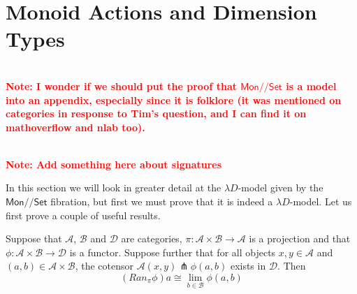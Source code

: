 \documentclass[a4paper,UKenglish]{lipics}
\newcommand\note[1]{{ \bf \textcolor{red} {\vspace{2mm}\; \\ Note: #1\\}}}
\newcommand{\ra}{\rightarrow}
\newcommand{\msf}[1]{\mathsf{#1}} %
\newcommand{\Mon}{\msf{Mon}}
\newcommand{\Set}{\msf{Set}}
\newcommand{\A}{\mathcal{A}}
\newcommand{\B}{\mathcal{B}}
\newcommand{\C}{\mathcal{C}}
\newcommand{\D}{\mathcal{D}}
\newcommand{\E}{\mathcal{E}}
\newcommand{\GroupSet}[1]{#1/\!/\Set}
\newcommand{\MonSet}{\GroupSet{\Mon}}
\newcommand{\UoMFibration}{UoM-fibration\xspace}
\begin{document}
%





\section{Monoid Actions and Dimension Types}\label{sec:MonSet}
\note{I wonder if we should put the proof
that $\MonSet$ is a model into an appendix, especially since it
is folklore (it was mentioned on categories in response to Tim's question, and I can find it on mathoverflow and nlab too).
}

\note{Add something here about signatures}

In this section we will look in greater detail at the $\lambda D$-model given by the $\MonSet$ fibration, but first we must prove that it is indeed a $\lambda D$-model. Let us first prove a couple of useful results.


\begin{lemma}
\label{lemma:RanAlongPrj}
 Suppose that $\A$, $\B$ and $\D$ are categories, $\pi: \A \times \B \rightarrow \A$ is a projection and that $\phi:\A \times \B \rightarrow \mathcal{D}$ is a functor. Suppose further that for all objects $x,y \in \A$ and $(a,b)\in \A \times \B$, the cotensor $\A(x, y) \pitchfork \phi (a,b)$ exists in $\mathcal{D}$. Then
 \[
  (Ran_{\pi}\phi)a \cong \lim_{b\in \B} \phi (a,b)
 \]
\end{lemma}
\end{document}
